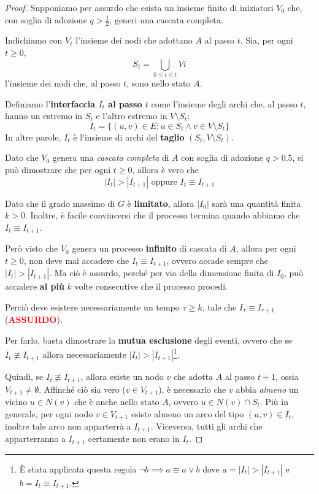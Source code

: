 \begin{proof}
    Supponiamo per assurdo che esista un insieme finito di iniziatori $V_0$ che, con soglia di adozione $q > \frac{1}{2}$, generi una cascata completa.

    Indichiamo con $V_t$ l'insieme dei nodi che adottano $A$ al passo $t$. Sia, per ogni $t \geq 0$,
    \[
    S_t = \bigcup_{0 \leq i \leq t} Vi
    \]
    l'insieme dei nodi che, al passo $t$, sono nello stato $A$. 
    
    Definiamo l'\textbf{interfaccia $I_t$ al passo $t$} come l'insieme degli archi che, al passo $t$, hanno un estremo in $S_t$ e l'altro estremo in $V \setminus S_t$:
    \[
    I_t = \{(u, v) \in E: u \in S_t \land v \in V \setminus S_t\}
    \]
    In altre parole, $I_t$ è l'insieme di archi del \textbf{taglio} $(S_t, V \setminus S_t)$.

    Dato che $V_0$ genera una \textit{cascata completa} di $A$ con soglia di adozione $q > 0.5$, si può dimostrare che per ogni $t \geq 0$, allora è vero che 
    \[
    |I_t| > |I_{t+1}| \text{ oppure } I_t \equiv I_{t+1}
    \]

    Dato che il grado massimo di $G$ è \textbf{limitato}, allora $|I_0|$ sarà una quantità finita $k > 0$.
    Inoltre, è facile convincersi che il processo termina quando abbiamo che $I_t \equiv I_{t+1}$.
    
    Però visto che $V_0$ genera un processo \textbf{infinito} di cascata di $A$, allora per ogni $t \geq 0$, non deve mai accadere che $I_t \equiv I_{t+1}$, ovvero accade sempre che $|I_t| > |I_{t+1}|$.
    Ma ciò è assurdo, perché per via della dimensione finita di $I_0$, può accadere \textbf{al più} $k$ volte consecutive che il processo procedi.
    
    Perciò deve esistere necessariamente un tempo $\tau \geq k$, tale che $I_\tau \equiv I_{\tau + 1}$ (\textbf{\textcolor{red}{ASSURDO}}).

    Per farlo, basta dimostrare la \textbf{mutua esclusione} degli eventi, ovvero che se $I_t \not\equiv I_{t+1}$ allora necessariamente $|I_t| > |I_{t+1}|$\footnote{È stata applicata questa regola  $\lnot b \implies a \equiv a \lor b$ dove $a = |I_t| > |I_{t+1}|$ e $b = I_t \equiv I_{t+1}$.}.

    Quindi, se $I_t \not\equiv I_{t+1}$, allora esiste un nodo $v$ che adotta $A$ al passo $t + 1$, ossia $V_{t+1} \neq \emptyset$. Affinché ciò sia vero ($v \in V_{t+1}$), è necessario che $v$ abbia \textit{almeno} un vicino $u \in N(v)$ che è anche nello stato $A$, ovvero $u \in N(v) \cap S_t$. Più in generale, per ogni nodo $v \in V_{t+1}$ esiste almeno un arco del tipo $(u,v) \in I_t$, inoltre tale arco non apparterrà a $I_{t+1}$.
    Viceversa, tutti gli archi che apparterranno a $I_{t+1}$ certamente non erano in $I_t$.


\end{proof}
